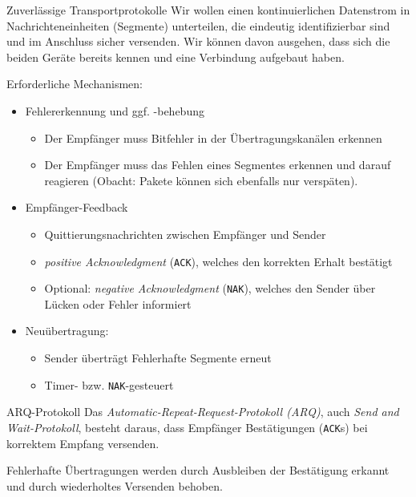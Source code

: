 \begin{bonus}{Zuverlässige Transportprotokolle}
    Wir wollen einen kontinuierlichen Datenstrom in Nachrichteneinheiten (Segmente) unterteilen, die eindeutig identifizierbar sind und im Anschluss sicher versenden.
    Wir können davon ausgehen, dass sich die beiden Geräte bereits kennen und eine Verbindung aufgebaut haben.

    Erforderliche Mechanismen:
    \begin{itemize}
        \item Fehlererkennung und ggf. -behebung
              \begin{itemize}
                  \item Der Empfänger muss Bitfehler in der Übertragungskanälen erkennen
                  \item Der Empfänger muss das Fehlen eines Segmentes erkennen und darauf reagieren (Obacht: Pakete können sich ebenfalls nur verspäten).
              \end{itemize}
        \item Empfänger-Feedback
              \begin{itemize}
                  \item Quittierungsnachrichten zwischen Empfänger und Sender
                  \item \emph{positive Acknowledgment} (\texttt{ACK}), welches den korrekten Erhalt bestätigt
                  \item Optional: \emph{negative Acknowledgment} (\texttt{NAK}), welches den Sender über Lücken oder Fehler informiert
              \end{itemize}
        \item Neuübertragung:
              \begin{itemize}
                  \item Sender überträgt Fehlerhafte Segmente erneut
                  \item Timer- bzw. \texttt{NAK}-gesteuert
              \end{itemize}
    \end{itemize}
\end{bonus}

\begin{defi}{ARQ-Protokoll}
    Das \emph{Automatic-Repeat-Request-Protokoll (ARQ)}, auch \emph{Send and Wait-Protokoll}, besteht daraus, dass Empfänger Bestätigungen (\texttt{ACK}s) bei korrektem Empfang versenden.

    Fehlerhafte Übertragungen werden durch Ausbleiben der Bestätigung erkannt und durch wiederholtes Versenden behoben.
\end{defi}

